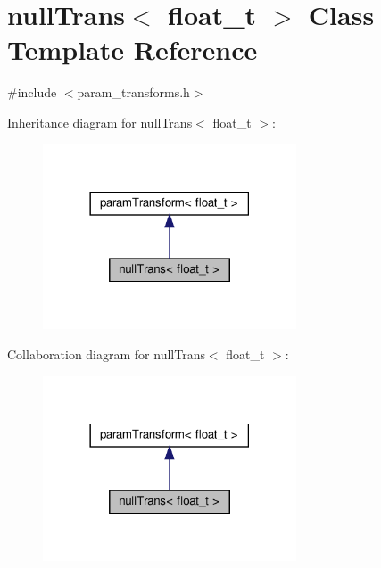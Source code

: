 \hypertarget{classnullTrans}{}\section{null\+Trans$<$ float\+\_\+t $>$ Class Template Reference}
\label{classnullTrans}


{\ttfamily \#include $<$param\+\_\+transforms.\+h$>$}



Inheritance diagram for null\+Trans$<$ float\+\_\+t $>$\+:\nopagebreak
\begin{figure}[H]
\begin{center}
\leavevmode
\includegraphics[width=213pt]{classnullTrans__inherit__graph}
\end{center}
\end{figure}


Collaboration diagram for null\+Trans$<$ float\+\_\+t $>$\+:\nopagebreak
\begin{figure}[H]
\begin{center}
\leavevmode
\includegraphics[width=213pt]{classnullTrans__coll__graph}
\end{center}
\end{figure}
